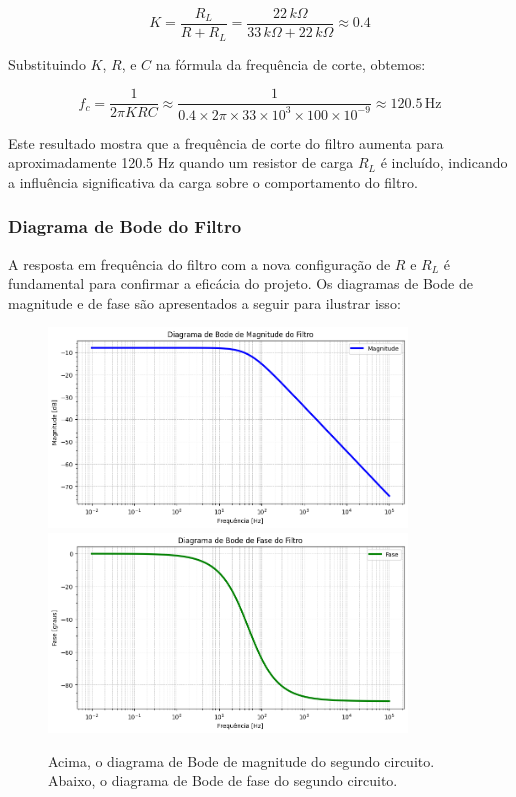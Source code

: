 \documentclass[
	12pt,				%
	openright,			%
	twoside,			%
	a4paper,			%
	english,			%
	french,				%
	spanish,			%
	brazil,				%
	]{abntex2}
\begin{document}
\begin{equation}
    K = \frac{R_L}{R + R_L} = \frac{22 \, k\Omega}{33 \, k\Omega + 22 \, k\Omega} \approx 0.4
    \label{eq:k_factor_loaded}
\end{equation}

Substituindo \( K \), \( R \), e \( C \) na fórmula da frequência de corte, obtemos:

\begin{equation}
    f_c = \frac{1}{{2\pi}KRC} \approx \frac{1}{0.4 \times {2\pi} \times 33 \times 10^3 \times 100 \times 10^{-9}} \approx 120.5 \, \text{Hz}
    \label{eq:omega_c_loaded}
\end{equation}

Este resultado mostra que a frequência de corte do filtro aumenta para aproximadamente 120.5 Hz quando um resistor de carga \( R_L \) é incluído, indicando a influência significativa da carga sobre o comportamento do filtro.


\subsubsection{Diagrama de Bode do Filtro}

A resposta em frequência do filtro com a nova configuração de \( R \) e \( R_L \) é fundamental para confirmar a eficácia do projeto. Os diagramas de Bode de magnitude e de fase são apresentados a seguir para ilustrar isso:

\begin{figure}[H]  
    \centering
    \includegraphics[width=0.85\textwidth]{imgs/second_circuit_bode_magnitude.png}
    \hspace{0.05\textwidth}
    \includegraphics[width=0.85\textwidth]{imgs/second_circuit_bode_phase.png}
    \caption{Acima, o diagrama de Bode de magnitude do segundo circuito. Abaixo, o diagrama de Bode de fase do segundo circuito.}
    \label{fig:second_circuit_bode_diagrams}
\end{figure}
\end{document}
